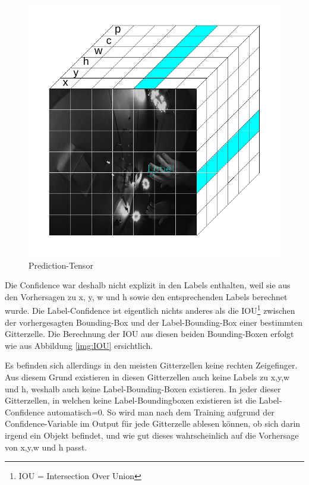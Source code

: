 \begin{figure}	
	\centering
	\includegraphics[width=.7\textwidth]{Kapitel/50Kostenfunktion/Bilder/PredictionTensor.pdf}
	\caption{Prediction-Tensor}
	\label{img:prediction_tensor}
\end{figure} 

Die Confidence war deshalb nicht explizit in den Labels enthalten, weil sie aus den Vorhersagen zu x, y, w und h sowie den entsprechenden Labels berechnet wurde.
Die Label-Confidence ist eigentlich nichts anderes als die IOU\footnote{\label{foot:1}IOU = Intersection Over Union} zwischen der vorhergesagten Bounding-Box und der Label-Bounding-Box einer bestimmten Gitterzelle. 
Die Berechnung der IOU aus diesen beiden Bounding-Boxen erfolgt wie aus Abbildung \ref{img:IOU} ersichtlich.

Es befinden sich allerdings in den meisten Gitterzellen keine rechten Zeigefinger. 
Aus diesem Grund existieren in diesen Gitterzellen auch keine Labels zu x,y,w und h, weshalb auch keine Label-Bounding-Boxen existieren.
In jeder dieser Gitterzellen, in welchen keine Label-Boundingboxen existieren ist die Label-Confidence automatisch=0. 
So wird man nach dem Training aufgrund der Confidence-Variable im Output für jede Gitterzelle ablesen können, ob sich darin irgend ein Objekt befindet, und wie gut dieses wahrscheinlich auf die Vorhersage von x,y,w und h passt.


